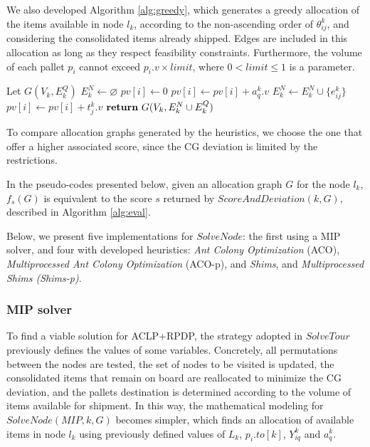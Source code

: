 \documentclass[preprint,authoryear]{elsarticle}
\begin{document}
We also developed Algorithm \ref{alg:greedy}, which generates a greedy allocation of the items available in node $l_k$, according to the non-ascending order of $\theta^k_{ij}$, and considering the consolidated items already shipped. Edges are included in this allocation as long as they respect feasibility constraints. Furthermore, the volume of each pallet $p_i$\/ cannot exceed $p_i.v \times limit$, where $ 0 < limit \leq 1$\/ is a parameter.

\begin{algorithm}[H]
	\caption{ $Greedy(k, G, limit)$}  \label{alg:greedy}

	\begin{algorithmic}[1]
		\State Let $G(V_k, E^Q_k)$
		\State $E^N_k \gets \varnothing$ 			
			\State $pv[i] \gets 0$ 		
		\EndFor
				\State $pv[i] \gets pv[i] + a_q^k.v$ 
			\EndIf		
		\EndFor		
				\State $E^N_k \gets E^N_k \cup \{e_{ij}^k\}$ 
				\State $pv[i] \gets pv[i] + t_j^k.v$ 	
			\EndIf
		\EndFor
		\State ${\bf return}\ G(V_k, E^N_k \cup E^Q_k)$
		
	\end{algorithmic}
\end{algorithm}

To compare allocation graphs generated by the heuristics, we choose the one that offer a higher associated score, since the CG deviation is limited by the restrictions.

In the pseudo-codes presented below, given an allocation graph $G$\/ for the node $l_k$, $f_s(G)$\/ is equivalent to the score $s$\/ returned by $ScoreAndDeviation(k,G) $, described in Algorithm \ref{alg:eval}.

Below, we present five implementations for $SolveNode$: the first using a MIP solver, and four with developed heuristics: {\it Ant Colony Optimization}\/ (ACO), {\it Multiprocessed Ant Colony Optimization}\/ (ACO-p),  and {\it Shims},  and {\it Multiprocessed Shims (Shims-p)}.



\subsubsection{MIP solver}
\label{solver}

To find a viable solution for ACLP+RPDP, the strategy adopted in $SolveTour$\/ previously defines the values of some variables. Concretely, all permutations between the nodes are tested, the set of nodes to be visited is updated, the consolidated items that remain on board are reallocated to minimize the CG deviation, and the pallets destination is determined according to the volume of items available for shipment. In this way, the mathematical modeling for $SolveNode(MIP,k,G)$\/ becomes simpler, which finds an allocation of available items in node $l_k$\/ using previously defined values of $L_k$, $p_i.to[k]$, $Y^k_{iq}$\/ and $a^k_q$. 
\end{document}

